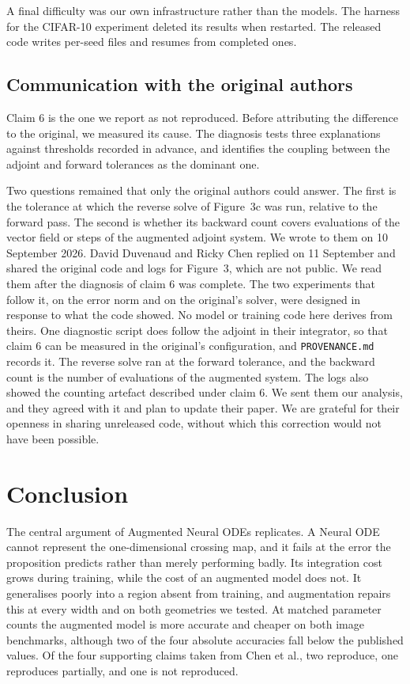 A final difficulty was our own infrastructure rather than the models. The harness for the
CIFAR-10 experiment deleted its results when restarted. The released code writes per-seed files
and resumes from completed ones.

\subsection{Communication with the original authors}
\label{sec:communication}

Claim 6 is the one we report as not reproduced. Before attributing the difference to the original, we measured its cause. The diagnosis tests three explanations against thresholds recorded in advance, and
identifies the coupling between the adjoint and forward tolerances as the dominant one.

Two questions remained that only the original authors could answer. The first is the tolerance
at which the reverse solve of Figure~3c was run, relative to the forward pass. The second is
whether its backward count covers evaluations of the vector field or steps of the augmented
adjoint system. We wrote to
them on 10 September 2026. David Duvenaud and Ricky Chen replied on 11 September and shared the original code
and logs for Figure~3, which are not public. We read them after the diagnosis of claim 6 was complete. The two
experiments that follow it, on the error norm and on the original's solver, were designed in
response to what the code showed. No model or training code here derives from
theirs. One diagnostic script does follow the adjoint in their integrator, so that claim 6 can
be measured in the original's configuration, and \texttt{PROVENANCE.md} records it. The reverse solve ran at the forward tolerance, and the backward count is the number
of evaluations of the augmented system. The logs also showed the counting artefact described under claim 6. We sent
them our analysis, and they agreed with it and plan to update their paper. We are grateful for
their openness in sharing unreleased code, without which this correction would not have been
possible.

\section{Conclusion}

The central argument of Augmented Neural ODEs replicates. A Neural ODE cannot represent the
one-dimensional crossing map, and it fails at the error the proposition predicts rather than
merely performing badly. Its integration cost grows during training, while the cost of an
augmented model does not. It generalises poorly into a region absent from training, and
augmentation repairs this at every width and on both geometries we tested. At matched parameter
counts the augmented model is more accurate and cheaper on both image benchmarks, although two
of the four absolute accuracies fall below the published values. Of the four supporting claims
taken from Chen et al., two reproduce, one reproduces partially, and one is not reproduced.

